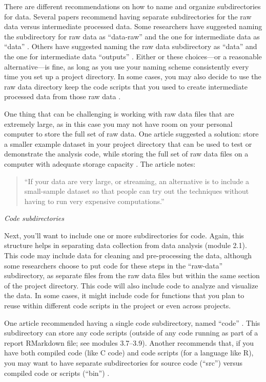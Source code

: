 \documentclass[]{tufte-book}
\begin{document}
There are different recommendations on how to name and organize subdirectories
for data. Several papers recommend having separate subdirectories for the raw
data versus intermediate processed data. Some researchers have suggested naming
the subdirectory for raw data as ``data-raw'' and the one for intermediate data as
``data'' \citep{vuorre2021sharing, prodigenr}. Others have suggested naming the raw
data subdirectory as ``data'' and the one for intermediate data ``outputs''
\citep{blischak2019creating}. Either or these choices---or a reasonable
alternative---is fine, as long as you use your naming scheme consistently every
time you set up a project directory. In some cases, you may also decide to use
the raw data directory keep the code scripts that you used to create
intermediate processed data from those raw data \citep{prodigenr}.

One thing that can be challenging is working with raw data files that are
extremely large, as in this case you may not have room on your personal computer
to store the full set of raw data. One article suggested a solution: store a
smaller example dataset in your project directory that can be used to test or
demonstrate the analysis code, while storing the full set of raw data files on a
computer with adequate storage capacity \citep{marwick2018packaging}. The article
notes:

\begin{quote}
``If your data are very large, or streaming, an alternative is to include a
small-sample dataset so that people can try out the techniques without having to
run very expensive computations.'' \citep{marwick2018packaging}
\end{quote}

\emph{Code subdirectories}

Next, you'll want to include one or more subdirectories for code. Again, this
structure helps in separating data collection from data analysis (module 2.1).
This code may include data for cleaning and pre-processing the data, although
some researchers choose to put code for these steps in the ``raw-data''
subdirectory, as separate files from the raw data files but within the same
section of the project directory. This code will also include code to analyze
and visualize the data. In some cases, it might include code for functions that
you plan to reuse within different code scripts in the project or even across
projects.

One article recommended having a single code subdirectory, named
``code'' \citep{blischak2019creating}. This subdirectory can
store any code scripts (outside of any code running as part of a report
RMarkdown file; see modules 3.7--3.9). Another recommends that, if you
have both compiled code (like C code) and code scripts (for a language
like R), you may want to have separate subdirectories for source code (``src'')
versus compiled code or scripts (``bin'') \citep{noble2009quick}.
\end{document}
